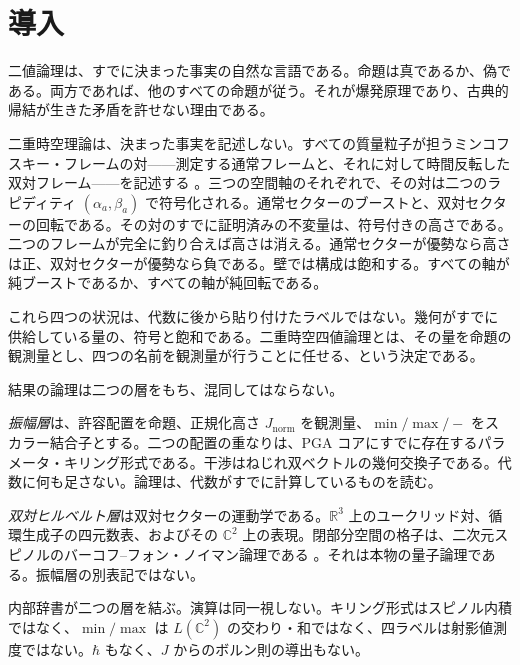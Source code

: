 \documentclass[a4paper]{article}
\theoremstyle{definition}
\newcommand{\Jnorm}{J_{\mathrm{norm}}}
\begin{document}
\section{導入}
\label{sec:position}

二値論理は、すでに決まった事実の自然な言語である。命題は真であるか、偽である。両方であれば、他のすべての命題が従う。それが爆発原理であり、古典的帰結が生きた矛盾を許せない理由である。

二重時空理論は、決まった事実を記述しない。すべての質量粒子が担うミンコフスキー・フレームの対——測定する通常フレームと、それに対して時間反転した双対フレーム——を記述する \cite{DST2025,Diophantine2026}。三つの空間軸のそれぞれで、その対は二つのラピディティ \((\alpha_a,\beta_a)\) で符号化される。通常セクターのブーストと、双対セクターの回転である。その対のすでに証明済みの不変量は、符号付きの高さである。二つのフレームが完全に釣り合えば高さは消える。通常セクターが優勢なら高さは正、双対セクターが優勢なら負である。壁では構成は飽和する。すべての軸が純ブーストであるか、すべての軸が純回転である。

これら四つの状況は、代数に後から貼り付けたラベルではない。幾何がすでに供給している量の、符号と飽和である。二重時空四値論理とは、その量を命題の観測量とし、四つの名前を観測量が行うことに任せる、という決定である。

結果の論理は二つの層をもち、混同してはならない。

\emph{振幅層}は、許容配置を命題、正規化高さ \(\Jnorm\) を観測量、\(\min/\max/-\) をスカラー結合子とする。二つの配置の重なりは、PGA コアにすでに存在するパラメータ・キリング形式である。干渉はねじれ双ベクトルの幾何交換子である。代数に何も足さない。論理は、代数がすでに計算しているものを読む。

\emph{双対ヒルベルト層}は双対セクターの運動学である。\(\mathbb{R}^3\) 上のユークリッド対、循環生成子の四元数表、およびその \(\mathbb{C}^2\) 上の表現。閉部分空間の格子は、二次元スピノルのバーコフ--フォン・ノイマン論理である \cite{BvN1936}。それは本物の量子論理である。振幅層の別表記ではない。

内部辞書が二つの層を結ぶ。演算は同一視しない。キリング形式はスピノル内積ではなく、\(\min/\max\) は \(L(\mathbb{C}^2)\) の交わり・和ではなく、四ラベルは射影値測度ではない。\(\hbar\) もなく、\(J\) からのボルン則の導出もない。
\end{document}
